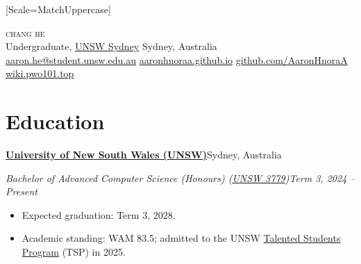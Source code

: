 \documentclass[11pt,a4paper]{article}
\newcommand{\cventry}[4]{%
  \textbf{#1}\hfill #2\par
  \vspace{1pt}%
  \textit{#3}\hfill \textit{#4}\par}
\newcommand{\sep}{\hspace{0.6em}{\color{ruleink}\textperiodcentered}\hspace{0.6em}}
\begin{document}
\newfontfamily{}[Scale=MatchUppercase]
\begin{center}
  {\huge\scshape{}chang he}%
  \hspace{0.5em}{\Large\itshape (Aaron)}\\[9pt]
  {\small\color{quietink}%
   Undergraduate, \href{https://www.unsw.edu.au}{UNSW Sydney}%
   \sep Sydney, Australia}\\[5pt]
  {\small
   \href{mailto:aaron.he@student.unsw.edu.au}{{\cvicon{}}\hspace{0.4em}aaron.he@student.unsw.edu.au}%
   \hspace{1.6em}%
   \href{https://aaronhnoraa.github.io}{{\cvicon{}}\hspace{0.4em}aaronhnoraa.github.io}%
   \hspace{1.6em}%
   \href{https://github.com/AaronHnoraA}{{\cvicon{}}\hspace{0.4em}github.com/AaronHnoraA}%
   \hspace{1.6em}%
   \href{https://wiki.pwo101.top/wiki}{{\cvicon{}}\hspace{0.4em}wiki.pwo101.top}}
\end{center}

\section{Education}

\cventry
  {\href{https://www.unsw.edu.au}{University of New South Wales (UNSW)}}
  {Sydney, Australia}
  {Bachelor of Advanced Computer Science (Honours) (\href{https://www.handbook.unsw.edu.au/undergraduate/programs/2026/3779}{UNSW 3779})}
  {Term 3, 2024 – Present}

\begin{itemize}
  \item Expected graduation: Term 3, 2028.
  \item Academic standing: WAM 83.5; admitted to the UNSW \href{https://www.unsw.edu.au/science/student-life-resources/student-opportunities/talented-students-program}{Talented Students Program} (TSP) in 2025.
\end{itemize}
\end{document}
